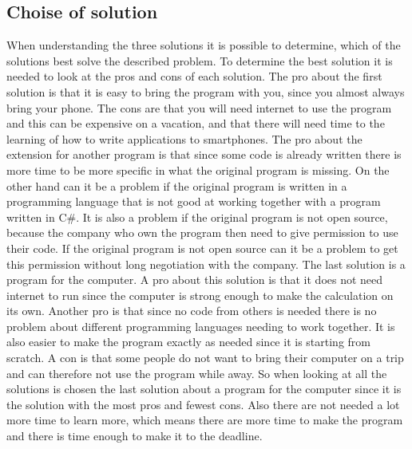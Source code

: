 \subsection{Choise of solution}
When understanding the three solutions it is possible to determine, which of the solutions best solve the described problem. To determine the best solution it is needed to look at the pros and cons of each solution. The pro about the first solution is that it is easy to bring the program with you, since you almost always bring your phone. The cons are that you will need internet to use the program and this can be expensive on a vacation, and that there will need time to the learning of how to write applications to smartphones. The pro about the extension for another program is that since some code is already written there is more time to be more specific in what the original program is missing. On the other hand can it be a problem if the original program is written in a programming language that is not good at working together with a program written in C#. It is also a problem if the original program is not open source, because the company who own the program then need to give permission to use their code. If the original program is not open source can it be a problem to get this permission without long negotiation with the company. The last solution is a program for the computer. A pro about this solution is that it does not need internet to run since the computer is strong enough to make the calculation on its own. Another pro is that since no code from others is needed there is no problem about different programming languages needing to work together. It is also easier to make the program exactly as needed since it is starting from scratch. A con is that some people do not want to bring their computer on a trip and can therefore not use the program while away. So when looking at all the solutions is chosen the last solution about a program for the computer since it is the solution with the most pros and fewest cons. Also there are not needed a lot more time to learn more, which means there are more time to make the program and there is time enough to make it to the deadline. 